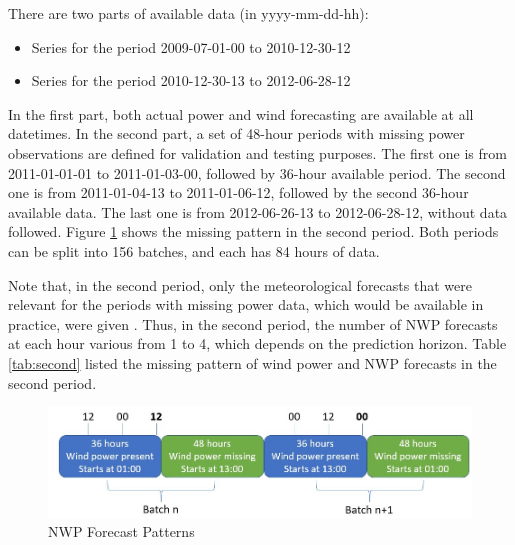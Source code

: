 \documentclass[conference]{IEEEtran}
\begin{document}
There are two parts of available data (in yyyy-mm-dd-hh):
\begin{itemize}
\item Series for the period 2009-07-01-00 to 2010-12-30-12
\item Series for the period 2010-12-30-13 to 2012-06-28-12
\end{itemize}
In the first part, both actual power and wind forecasting are available at all datetimes. In the second part, a set of 48-hour periods with missing power observations are defined for validation and testing purposes. The first one is from 2011-01-01-01 to 2011-01-03-00, followed by 36-hour available period. The second one is from 2011-01-04-13 to 2011-01-06-12, followed by the second 36-hour available data. The last one is from 2012-06-26-13 to 2012-06-28-12, without data followed. Figure \ref{fig:missing} shows the missing pattern in the second period. Both periods can be split into 156 batches, and each has 84 hours of data. 

Note that, in the second period, only the meteorological forecasts that were relevant for the periods with missing power data, which would be available in practice, were given \cite{HONG2014357}. Thus, in the second period, the number of NWP forecasts at each hour various from 1 to 4, which depends on the prediction horizon. Table \ref{tab:second} listed the missing pattern of wind power and NWP forecasts in the second period. 

\begin{table}
\caption {Missing Patterns in the Second Period}
\begin{center}
\label{tab:second}
\end{center}
\vspace*{-5mm}
\end{table}

\begin{figure}
\centering
\includegraphics[width=0.9\columnwidth]{FIG/missing}
\caption{NWP Forecast Patterns}
\label{fig:missing}
\end{figure}
\end{document}
